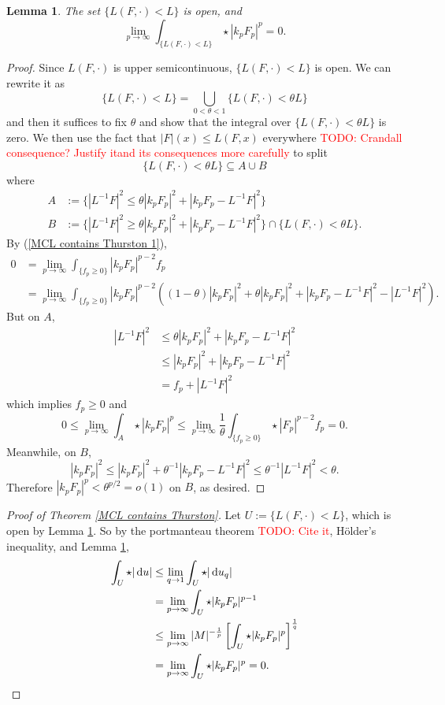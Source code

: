 \documentclass[reqno,11pt]{amsart}
\newcommand*\dif{\mathop{}\!\mathrm{d}}
\newtheorem{lemma}[theorem]{Lemma}
\theoremstyle{definition}
\numberwithin{equation}{section}
\newcommand\todo[1]{\textcolor{red}{TODO: #1}}
\begin{document}
\begin{lemma}\label{MCL contains Thurston lemma}
The set $\{L(F, \cdot) < L\}$ is open, and
$$\lim_{p \to \infty} \int_{\{L(F, \cdot) < L\}} \star |k_p F_p|^p = 0.$$
\end{lemma}
\begin{proof}
Since $L(F, \cdot)$ is upper semicontinuous, $\{L(F, \cdot) < L\}$ is open.
We can rewrite it as 
$$\{L(F, \cdot) < L\} = \bigcup_{0 < \theta < 1} \{L(F, \cdot) < \theta L\}$$
and then it suffices to fix $\theta$ and show that the integral over $\{L(F, \cdot) < \theta L\}$ is zero.
We then use the fact that $|F|(x) \leq L(F, x)$ everywhere \todo{Crandall consequence? Justify itand its consequences more carefully} to split
$$\{L(F, \cdot) < \theta L\} \subseteq A \cup B$$
where 
\begin{align*}
A &:= \{|L^{-1} F|^2 \leq \theta |k_p F_p|^2 + |k_p F_p - L^{-1} F|^2\} \\
B &:= \{|L^{-1} F|^2 \geq \theta |k_p F_p|^2 + |k_p F_p - L^{-1} F|^2\} \cap \{L(F, \cdot) < \theta L\} .
\end{align*}
By (\ref{MCL contains Thurston 1}),
\begin{align*}
0 &= \lim_{p \to \infty} \int_{\{f_p \geq 0\}} |k_p F_p|^{p - 2} f_p \\
&= \lim_{p \to \infty} \int_{\{f_p \geq 0\}} |k_p F_p|^{p - 2}((1 - \theta) |k_p F_p|^2 + \theta |k_p F_p|^2 + |k_p F_p - L^{-1} F|^2 - |L^{-1} F|^2).
\end{align*}
But on $A$,
\begin{align*}
|L^{-1} F|^2 &\leq \theta |k_p F_p|^2 + |k_p F_p - L^{-1} F|^2 \\
&\leq |k_p F_p|^2 + |k_p F_p - L^{-1} F|^2 \\
&= f_p + |L^{-1} F|^2
\end{align*}
which implies $f_p \geq 0$ and 
$$0 \leq \lim_{p \to \infty} \int_A \star |k_p F_p|^p \leq \lim_{p \to \infty} \frac{1}{\theta} \int_{\{f_p \geq 0\}} \star |F_p|^{p - 2} f_p = 0.$$
Meanwhile, on $B$,
$$|k_p F_p|^2 \leq |k_p F_p|^2 + \theta^{-1} |k_p F_p - L^{-1} F|^2 \leq \theta^{-1} |L^{-1} F|^2 < \theta.$$
Therefore $|k_p F_p|^p < \theta^{p/2} = o(1)$ on $B$, as desired.
\end{proof}

\begin{proof}[Proof of Theorem \ref{MCL contains Thurston}]
Let $U := \{L(F, \cdot) < L\}$, which is open by Lemma \ref{MCL contains Thurston lemma}.
So by the portmanteau theorem \todo{Cite it}, H\"older's inequality, and Lemma \ref{MCL contains Thurston lemma},
\begin{align*}
\int_U \star |\dif u|
&\leq \lim_{q \to 1} \int_U \star |\dif u_q| \\
&= \lim_{p \to \infty} \int_U \star |k_p F_p|^{p - 1} \\
&\leq \lim_{p \to \infty} |M|^{-\frac{1}{p}} \left[\int_U \star |k_p F_p|^p\right]^{\frac{1}{q}} \\
&= \lim_{p \to \infty} \int_U \star |k_p F_p|^p = 0. \qedhere
\end{align*}
\end{proof}
\end{document}
